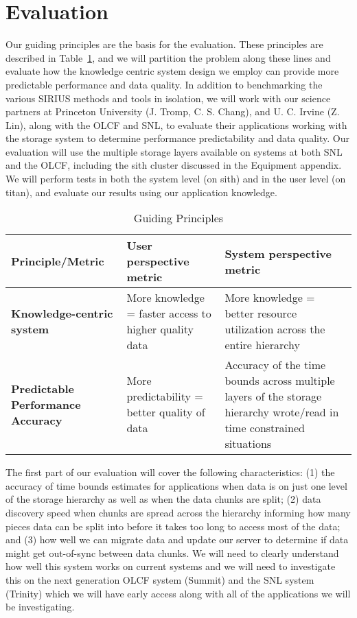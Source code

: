 \section{Evaluation}
\label{sec:evaluation}

Our guiding principles are the basis for the evaluation. These principles are
described in Table~\ref{table:eval}, and we will partition the problem along these
lines and evaluate how the knowledge centric system design we employ can
provide more predictable performance and data quality. 
In addition to benchmarking the various SIRIUS methods and tools in isolation,
we will work with our science partners at Princeton University (J. Tromp, C. S. Chang),
and U. C. Irvine (Z. Lin), along with the OLCF and SNL,
to evaluate their applications working with the storage system to
determine performance predictability and data quality.  Our evaluation 
will use the multiple storage layers available on systems at both SNL and the
OLCF, including the sith cluster discussed in the Equipment appendix. 
 We will perform tests in both the system level (on sith) and in
the user level (on titan), and evaluate our results using our application
knowledge.


\begin{table}[ht]
\small
\centering
\caption{Guiding Principles}
\label{table:eval}
\begin{tabular}{ | p{1.4in} | p{2in} | p{2.5in} | }
  \hline
  {\bf Principle/Metric}                   & {\bf User perspective metric}   & {\bf System perspective metric }\\ \hline
  {\bf Knowledge-centric system}           & More knowledge = faster access to higher quality data &  More knowledge = better resource utilization across the entire hierarchy \\ \hline
  {\bf Predictable Performance Accuracy}   & More predictability = better quality of data &  Accuracy of the time bounds across multiple layers of the storage hierarchy wrote/read in time constrained situations\\ \hline
\end{tabular}
\vspace{-2ex}
\normalsize
\end{table}


The first part of our evaluation will cover the following characteristics: (1)
the accuracy of time bounds estimates for applications when data is on just one
level of the storage hierarchy as well as when the data chunks are split; (2)
data discovery speed when chunks are spread across the hierarchy informing how
many pieces data can be split into before it takes too long to access most of
the data; and (3) how well we can migrate data and update our server to
determine if data might get out-of-sync between data chunks.  We will need to
clearly understand how well this system works on current systems and we will
need to investigate this on the next generation OLCF system (Summit) and the
SNL system (Trinity) which we will have early access along with all of the
applications we will be investigating.

